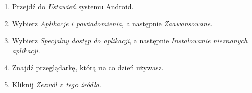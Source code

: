 \begin{enumerate}
	
	\item Przejdź do \textit{Ustawień} systemu Android.
	
	\item Wybierz \textit{Aplikacje i powiadomienia}, a następnie \textit{Zaawansowane}.
	
	\item Wybierz \textit{Specjalny dostęp do aplikacji}, a następnie \textit{Instalowanie nieznanych aplikacji}.
	
	\item Znajdź przeglądarkę, którą na co dzień używasz.
	
	\item Kliknij \textit{Zezwól z~tego źródła}.
	\clearpage
	

\end{enumerate}

